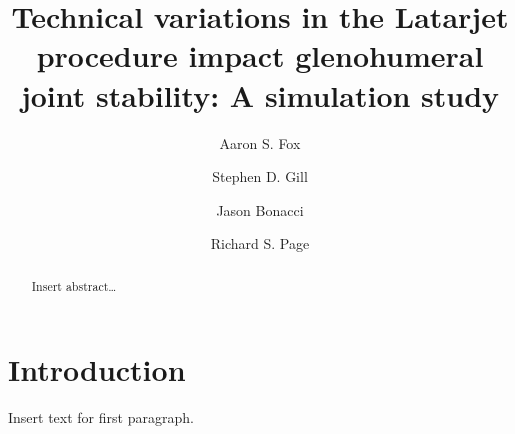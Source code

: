 \documentclass[]{elsarticle} %
\begin{document}
\begin{frontmatter}

  \title{Technical variations in the Latarjet procedure impact
glenohumeral joint stability: A simulation study}
    \author[Centre for Sports Research,Barwon Centre for Orthopaedic
Research and Education (B-CORE)]{Aaron S. Fox}
  
    \author[Barwon Centre for Orthopaedic Research and Education
(B-CORE),School of Medicine,Orthopaedic Department]{Stephen D. Gill}
  
    \author[Centre for Sports Research]{Jason Bonacci}
  
    \author[Barwon Centre for Orthopaedic Research and Education
(B-CORE),School of Medicine,Orthopaedic Department]{Richard S. Page}
  
      \address[Centre for Sports Research]{Centre for Sports Research,
School of Exercise and Nutrition Sciences, Deakin University, Geelong,
Australia}
    \address[Barwon Centre for Orthopaedic Research and Education
(B-CORE)]{Barwon Centre for Orthopaedic Research and Education (B-CORE),
Barwon Health, St John of Jod Hospital and Deakin University, Geelong,
Australia}
    \address[School of Medicine]{School of Medicine, Deakin University,
Geelong, Australia}
    \address[Orthopaedic Department]{Orthopaedic Department, University
Hospital Geelong, Barwon Health, Geelong, Australia}
  
  \begin{abstract}
  Insert abstract\ldots{}
  \end{abstract}
  
 \end{frontmatter}

\hypertarget{introduction}{%
\section{Introduction}\label{introduction}}

Insert text for first paragraph.
\end{document}
